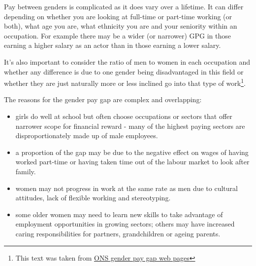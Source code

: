 \documentclass[
  11pt,
]{article}
\begin{document}
Pay between genders is complicated as it does vary over a lifetime. It
can differ depending on whether you are looking at full-time or
part-time working (or both), what age you are, what ethnicity you are
and your seniority within an occupation. For example there may be a
wider (or narrower) GPG in those earning a higher salary as an actor
than in those earning a lower salary.

It's also important to consider the ratio of men to women in each
occupation and whether any difference is due to one gender being
disadvantaged in this field or whether they are just naturally more or
less inclined go into that type of work\footnote{This text was taken
  from
  \href{https://www.ons.gov.uk/employmentandlabourmarket/peopleinwork/earningsandworkinghours/articles/testyourknowledgeonthegenderpaygap/2016-12-09}{ONS
  gender pay gap web pages}}.

The reasons for the gender pay gap are complex and overlapping:

\begin{itemize}
\item
  girls do well at school but often choose occupations or sectors that
  offer narrower scope for financial reward - many of the highest paying
  sectors are disproportionately made up of male employees.
\item
  a proportion of the gap may be due to the negative effect on wages of
  having worked part-time or having taken time out of the labour market
  to look after family.
\item
  women may not progress in work at the same rate as men due to cultural
  attitudes, lack of flexible working and stereotyping.
\item
  some older women may need to learn new skills to take advantage of
  employment opportunities in growing sectors; others may have increased
  caring responsibilities for partners, grandchildren or ageing parents.
\end{itemize}

\newpage


  
\end{document}
